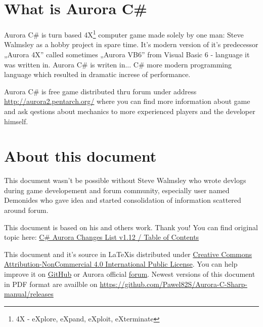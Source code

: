 \documentclass[../Aurora C# unofficial manual.tex]{subfiles}
\begin{document}
	\section{What is Aurora C\#}
	Aurora C\# is turn based 4X\footnote{4X - eXplore, eXpand, eXploit, eXterminate}
	computer game made solely by one man: Steve Walmsley as a hobby project in spare time.
	It's modern version of it's predecessor „Aurora 4X” called sometimes „Aurora VB6” from
	Visual Basic 6 - language it was written in. Aurora C\# is writen in... C\# more modern
	programming language which resulted in dramatic increse of performance.
	
	Aurora C\# is free game distributed thru forum under address
	\href{http://aurora2.pentarch.org/}{http://aurora2.pentarch.org/} where you can find
	more information about game and ask qestions about mechanics to more experienced
	players and the developer himself.
	
	
	\section{About this document}
	This document wasn't be possible without Steve Walmsley who wrote devlogs during game
	developement and forum community, especially user named Demonides who gave idea and
	started consolidation of information scattered around forum.
	
	This document is based on his and others work. Thank you! You can find original topic
	here: \href{http://aurora2.pentarch.org/index.php?topic=10666.0}{C\# Aurora Changes List v1.12 / Table of Contents}
	
	This document and it's source in \LaTeX is distributed under \href{https://creativecommons.org/licenses/by-nc/4.0/}{Creative Commons Attribution-NonCommercial 4.0 International Public License}. You can help improve it
	on \href{https://github.com/Pawel82S/Aurora-C-Sharp-manual}{GitHub} or Aurora official \href{http://aurora2.pentarch.org/}{forum}. Newest versions of this document in PDF format are availble on \href{https://github.com/Pawel82S/Aurora-C-Sharp-manual/releases}{https://github.com/Pawel82S/Aurora-C-Sharp-manual/releases}
\end{document}
